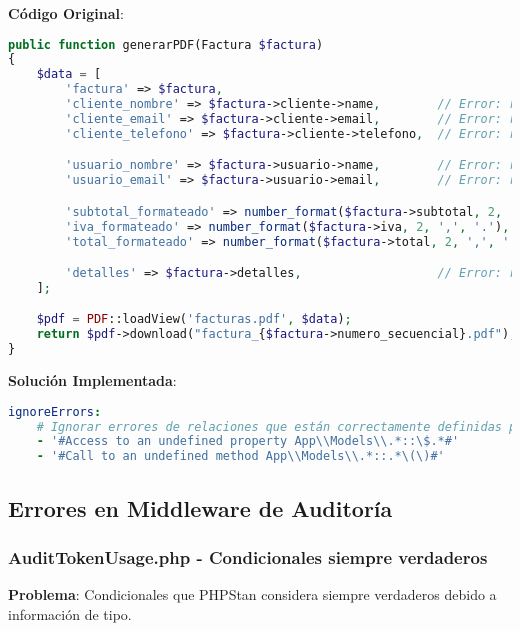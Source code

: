 \documentclass[12pt,a4paper]{article}
\begin{document}
\textbf{Código Original}:
\begin{lstlisting}[language=php, caption=FacturaController.php - Problemas con relaciones]
public function generarPDF(Factura $factura)
{
    $data = [
        'factura' => $factura,
        'cliente_nombre' => $factura->cliente->name,        // Error: relación no detectada
        'cliente_email' => $factura->cliente->email,        // Error: relación no detectada
        'cliente_telefono' => $factura->cliente->telefono,  // Error: relación no detectada

        'usuario_nombre' => $factura->usuario->name,        // Error: relación no detectada
        'usuario_email' => $factura->usuario->email,        // Error: relación no detectada

        'subtotal_formateado' => number_format($factura->subtotal, 2, ',', '.'),
        'iva_formateado' => number_format($factura->iva, 2, ',', '.'),
        'total_formateado' => number_format($factura->total, 2, ',', '.'),

        'detalles' => $factura->detalles,                   // Error: relación no detectada
    ];

    $pdf = PDF::loadView('facturas.pdf', $data);
    return $pdf->download("factura_{$factura->numero_secuencial}.pdf");
}
\end{lstlisting}

\textbf{Solución Implementada}:
\begin{lstlisting}[language=yaml, caption=Ignorado específico para relaciones Eloquent]
ignoreErrors:
    # Ignorar errores de relaciones que están correctamente definidas pero Larastan no detecta
    - '#Access to an undefined property App\\Models\\.*::\$.*#'
    - '#Call to an undefined method App\\Models\\.*::.*\(\)#'
\end{lstlisting}

\subsection{Errores en Middleware de Auditoría}

\subsubsection{AuditTokenUsage.php - Condicionales siempre verdaderos}

\textbf{Problema}: Condicionales que PHPStan considera siempre verdaderos debido a información de tipo.
\end{document}
